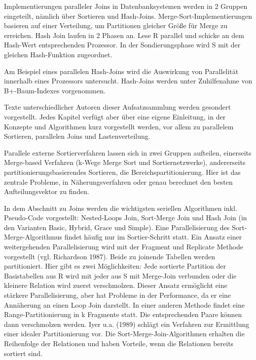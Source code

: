 \documentclass[a4paper,12pt,twoside]{article}
\begin{document}
Implementierungen paralleler Joins in Datenbanksystemen werden in 2 Gruppen eingeteilt, nämlich über Sortieren und Hash-Joins. Merge-Sort-Implementierungen basieren auf einer Verteilung, um Partitionen gleicher Größe für Merge zu erreichen. Hash Join laufen in 2 Phasen an. Lese R parallel und schicke an dem Hash-Wert entsprechenden Prozessor. In der Sondierungsphase wird S mit der gleichen Hash-Funktion zugeordnet.

\textbf{}

Am Beispiel eines parallelen Hash-Joins wird die Auswirkung von Parallelität innerhalb eines Prozessors untersucht. Hash-Joins werden unter Zuhilfenahme von B+-Baum-Indexes vorgenommen. 

\textbf{}

Texte unterschiedlicher Autoren dieser Aufsatzsammlung werden gesondert vorgestellt. Jedes Kapitel verfügt aber über eine eigene Einleitung, in der Konzepte und Algorithmen kurz vorgestellt werden, vor allem zu parallelem Sortieren, parallelen Joins und Lastenverteilung.

Parallele externe Sortierverfahren lassen sich in zwei Gruppen aufteilen, einerseits Merge-based Verfahren (k-Wege Merge Sort und Sortiernetzwerke), andererseits partitionierungsbasierendes Sortieren, die Bereichspartitionierung. Hier ist das zentrale Probleme, in Näherungsverfahren oder genau berechnet den besten Aufteilungsvektor zu finden.

In dem Abschnitt zu Joins werden die wichtigsten seriellen Algorithmen inkl. Pseudo-Code vorgestellt: Nested-Loops Join, Sort-Merge Join und Hash Join (in den Varianten Basic, Hybrid, Grace und Simple). Eine Parallelisierung des Sort-Merge-Algorithmus findet häufig nur im Sortier-Schritt statt. Ein Ansatz einer weitergehenden Parallelisierung wird mit der Fragment und Replicate Methode vorgestellt (vgl. Richardson 1987). Beide zu joinende Tabellen werden partitioniert. Hier gibt es zwei Möglichkeiten: Jede sortierte Partition der Basistabellen aus R wird mit jeder aus S mit Merge-Join verbunden oder die kleinere Relation wird zuerst verschmolzen. Dieser Ansatz ermöglicht eine stärkere Parallelisierung, aber hat Probleme in der Performance, da er eine Annäherung an einen Loop Join darstellt. In einer anderen Methode findet eine Range-Partitionierung in k Fragmente statt. Die entsprechenden Paare können dann verschmolzen werden. Iyer u.a. (1989) schlägt ein Verfahren zur Ermittlung einer idealer Partitionierung vor. Die Sort-Merge-Join-Algorithmen erhalten die Reihenfolge der Relationen und haben Vorteile, wenn die Relationen bereits sortiert sind.
\end{document}
